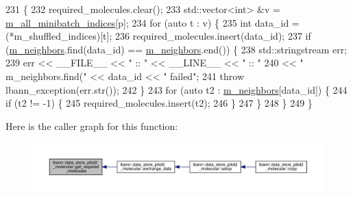 \begin{DoxyCode}
231                                                                                                          \{
232   required\_molecules.clear();
233   std::vector<int> &v = \hyperlink{classlbann_1_1generic__data__store_afd21d4f029e450328f8703dd72702e73}{m\_all\_minibatch\_indices}[p];
234   \textcolor{keywordflow}{for} (\textcolor{keyword}{auto} t : v) \{
235     \textcolor{keywordtype}{int} data\_id = (*m\_shuffled\_indices)[t];
236     required\_molecules.insert(data\_id);
237     \textcolor{keywordflow}{if} (\hyperlink{classlbann_1_1data__store__pilot2__molecular_a567c6bcdfab6f9248f3c320d505861bc}{m\_neighbors}.find(data\_id) == \hyperlink{classlbann_1_1data__store__pilot2__molecular_a567c6bcdfab6f9248f3c320d505861bc}{m\_neighbors}.end()) \{
238       std::stringstream err;
239       err << \_\_FILE\_\_  << \textcolor{stringliteral}{" :: "} << \_\_LINE\_\_ << \textcolor{stringliteral}{" :: "}
240           << \textcolor{stringliteral}{" m\_neighbors.find("} << data\_id << \textcolor{stringliteral}{" failed"};
241       \textcolor{keywordflow}{throw} lbann\_exception(err.str());
242     \}
243     \textcolor{keywordflow}{for} (\textcolor{keyword}{auto} t2 : \hyperlink{classlbann_1_1data__store__pilot2__molecular_a567c6bcdfab6f9248f3c320d505861bc}{m\_neighbors}[data\_id]) \{
244       \textcolor{keywordflow}{if} (t2 != -1) \{
245         required\_molecules.insert(t2);
246       \}
247     \}
248   \}
249 \}
\end{DoxyCode}
Here is the caller graph for this function\+:\nopagebreak
\begin{figure}[H]
\begin{center}
\leavevmode
\includegraphics[width=350pt]{classlbann_1_1data__store__pilot2__molecular_a7eadb63f1c879c62b587a7b5d972d4e4_icgraph}
\end{center}
\end{figure}
\mbox{\label{classlbann_1_1data__store__pilot2__molecular_a83dafc1e48b19b5d90f5618f64bfd158}} 
